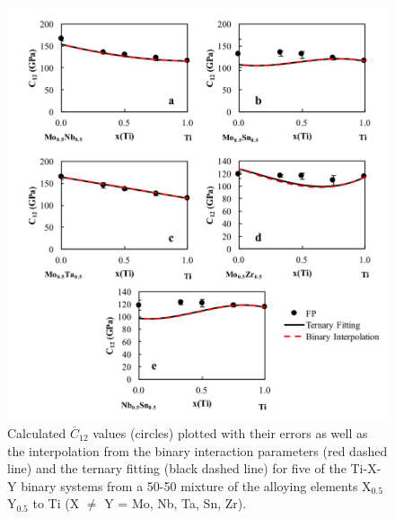 \pagebreak
\begin{figure}[H]
	\centering
	\includegraphics[width=\textwidth]{Chapter-6/Figures/tixyc121.png}
	\caption{Calculated $\overline{C}_{12}$ values (circles) plotted with their errors as well as the interpolation from the binary interaction parameters (red dashed line) and the ternary fitting (black dashed line) for five of the Ti-X-Y binary systems from a 50-50 mixture of the alloying elements X$_{0.5}$Y$_{0.5}$ to Ti (X $\neq$ Y = Mo, Nb, Ta, Sn, Zr).}
	\label{Ch6-figure:tixyc12_1}
\end{figure}

